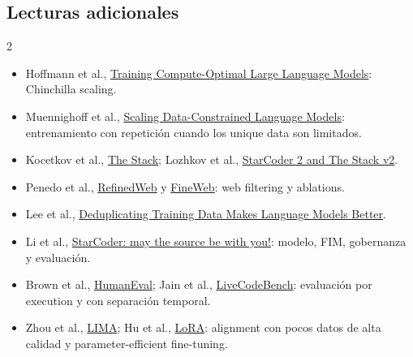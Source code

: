 \subsection{Lecturas adicionales}

\begin{multicols}{2}
\footnotesize
\begin{itemize}
  \setlength{\itemsep}{0.15em}
  \item Hoffmann et al., \href{https://arxiv.org/abs/2203.15556}{Training Compute-Optimal Large Language Models}: Chinchilla scaling.
  \item Muennighoff et al., \href{https://arxiv.org/abs/2305.16264}{Scaling Data-Constrained Language Models}: entrenamiento con repetición cuando los unique data son limitados.
  \item Kocetkov et al., \href{https://arxiv.org/abs/2211.15533}{The Stack}; Lozhkov et al., \href{https://arxiv.org/abs/2402.19173}{StarCoder 2 and The Stack v2}.
  \item Penedo et al., \href{https://arxiv.org/abs/2306.01116}{RefinedWeb} y \href{https://arxiv.org/abs/2406.17557}{FineWeb}: web filtering y ablations.
  \item Lee et al., \href{https://arxiv.org/abs/2107.06499}{Deduplicating Training Data Makes Language Models Better}.
  \item Li et al., \href{https://arxiv.org/abs/2305.06161}{StarCoder: may the source be with you!}: modelo, FIM, gobernanza y evaluación.
  \item Brown et al., \href{https://arxiv.org/abs/2107.03374}{HumanEval}; Jain et al., \href{https://arxiv.org/abs/2403.07974}{LiveCodeBench}: evaluación por execution y con separación temporal.
  \item Zhou et al., \href{https://arxiv.org/abs/2305.11206}{LIMA}; Hu et al., \href{https://arxiv.org/abs/2106.09685}{LoRA}: alignment con pocos datos de alta calidad y parameter-efficient fine-tuning.
\end{itemize}
\end{multicols}



